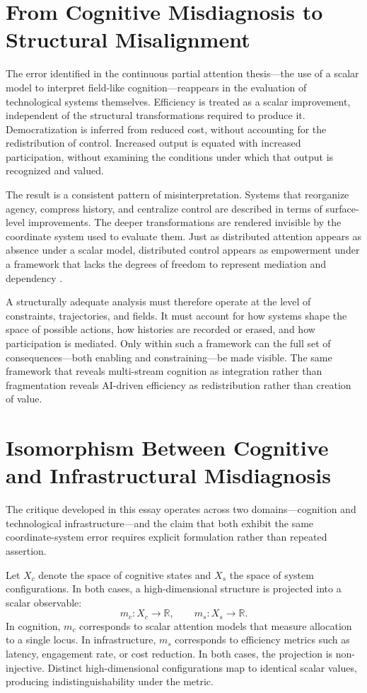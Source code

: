 \documentclass[12pt, a4paper]{article}
\begin{document}
\section{From Cognitive Misdiagnosis to Structural Misalignment}

The error identified in the continuous partial attention thesis---the use of a scalar model to interpret field-like cognition---reappears in the evaluation of technological systems themselves. Efficiency is treated as a scalar improvement, independent of the structural transformations required to produce it. Democratization is inferred from reduced cost, without accounting for the redistribution of control. Increased output is equated with increased participation, without examining the conditions under which that output is recognized and valued.

The result is a consistent pattern of misinterpretation. Systems that reorganize agency, compress history, and centralize control are described in terms of surface-level improvements. The deeper transformations are rendered invisible by the coordinate system used to evaluate them. Just as distributed attention appears as absence under a scalar model, distributed control appears as empowerment under a framework that lacks the degrees of freedom to represent mediation and dependency \cite{Ashby1956}.

A structurally adequate analysis must therefore operate at the level of constraints, trajectories, and fields. It must account for how systems shape the space of possible actions, how histories are recorded or erased, and how participation is mediated. Only within such a framework can the full set of consequences---both enabling and constraining---be made visible. The same framework that reveals multi-stream cognition as integration rather than fragmentation reveals AI-driven efficiency as redistribution rather than creation of value.

\section{Isomorphism Between Cognitive and Infrastructural Misdiagnosis}

The critique developed in this essay operates across two domains---cognition and technological infrastructure---and the claim that both exhibit the same coordinate-system error requires explicit formulation rather than repeated assertion.

Let $X_c$ denote the space of cognitive states and $X_s$ the space of system configurations. In both cases, a high-dimensional structure is projected into a scalar observable:
\[
m_c \colon X_c \to \mathbb{R}, \qquad m_s \colon X_s \to \mathbb{R}.
\]
In cognition, $m_c$ corresponds to scalar attention models that measure allocation to a single locus. In infrastructure, $m_s$ corresponds to efficiency metrics such as latency, engagement rate, or cost reduction. In both cases, the projection is non-injective. Distinct high-dimensional configurations map to identical scalar values, producing indistinguishability under the metric.
\end{document}
